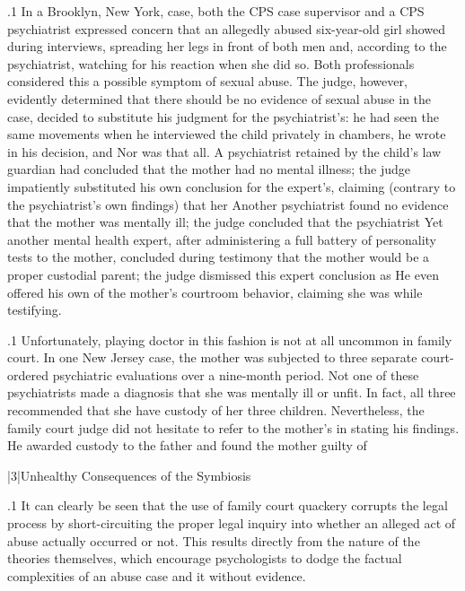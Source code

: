 \documentclass[11pt, twoside]{article}
\begin{document}
{\p.1{%
In a Brooklyn, New York, case, both the CPS case supervisor and a
CPS psychiatrist expressed concern that an allegedly abused
six-year-old girl showed  during interviews, spreading
her legs in front of both men and, according to the psychiatrist, watching for his reaction when she did so. Both professionals considered this
a possible symptom of sexual abuse. The judge, however, evidently determined that there should be no evidence of sexual abuse in the case,
decided to substitute his judgment for the psychiatrist’s: he had seen
the same movements when he interviewed the child privately in chambers, he wrote in his decision, and  Nor was that all. A psychiatrist retained by the child’s
law guardian had concluded that the mother had no mental illness;
the judge impatiently substituted his own conclusion for the expert’s,
claiming (contrary to the psychiatrist’s own findings) that her  Another psychiatrist found no
evidence that the mother was mentally ill; the judge concluded that the
psychiatrist  Yet another mental health expert, after administering a full battery of personality tests to the mother, concluded during
 testimony that the mother would be a proper custodial parent;
the judge dismissed this expert conclusion as  He
even offered his own  of the mother’s courtroom behavior,
claiming she was  while testifying.
}%

\p.1{%
Unfortunately, playing doctor in this fashion is not at all uncommon
in family court. In one New Jersey case, the mother was subjected to
three separate court-ordered psychiatric evaluations over a nine-month
period. Not one of these psychiatrists made a diagnosis that she was
mentally ill or unfit. In fact, all three recommended that she have custody of her three children. Nevertheless, the family court judge did
not hesitate to refer to the mother’s  in stating his findings. He
awarded custody to the father and found the mother guilty of 
}%


\s|3|{Unhealthy Consequences of the Symbiosis}

\p.1{%
\noindent{}It can clearly be seen that the use of family court quackery corrupts the
legal process by short-circuiting the proper legal inquiry into whether an
alleged act of abuse actually occurred or not. This results directly from
the nature of the theories themselves, which encourage psychologists to
dodge the factual complexities of an abuse case and  it without
evidence.
}%

}
\end{document}

